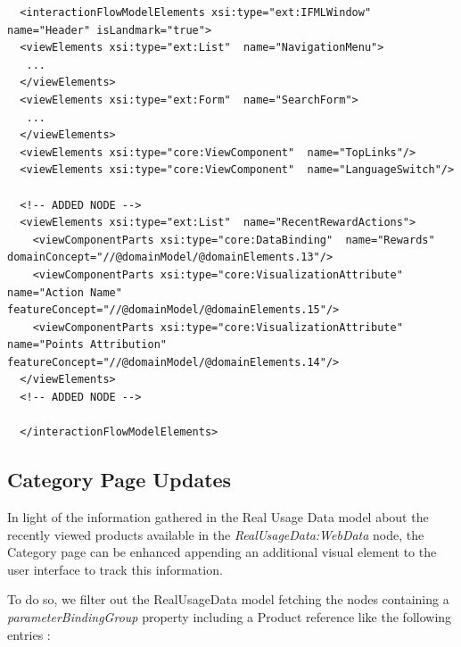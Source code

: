 \vspace{0.5cm}
\lstset{language=XML}
\begin{lstlisting} 
  <interactionFlowModelElements xsi:type="ext:IFMLWindow"  name="Header" isLandmark="true">
  <viewElements xsi:type="ext:List"  name="NavigationMenu">
   ...
  </viewElements>
  <viewElements xsi:type="ext:Form"  name="SearchForm">
   ...
  </viewElements>
  <viewElements xsi:type="core:ViewComponent"  name="TopLinks"/>
  <viewElements xsi:type="core:ViewComponent"  name="LanguageSwitch"/>

  <!-- ADDED NODE -->
  <viewElements xsi:type="ext:List"  name="RecentRewardActions">
    <viewComponentParts xsi:type="core:DataBinding"  name="Rewards" domainConcept="//@domainModel/@domainElements.13"/>
    <viewComponentParts xsi:type="core:VisualizationAttribute"  name="Action Name" featureConcept="//@domainModel/@domainElements.15"/>
    <viewComponentParts xsi:type="core:VisualizationAttribute"  name="Points Attribution" featureConcept="//@domainModel/@domainElements.14"/>
  </viewElements>
  <!-- ADDED NODE -->

  </interactionFlowModelElements>
\end{lstlisting}
\vspace{0.5cm}

\subsection{Category Page Updates}

In light of the information gathered in the Real Usage Data model about the recently viewed products available in the \textit{RealUsageData:WebData} node, the Category page can be enhanced appending an additional visual element to the user interface to track this information.

To do so, we filter out the RealUsageData model fetching the nodes containing a \textit{parameterBindingGroup} property including a Product reference like the following entries :

